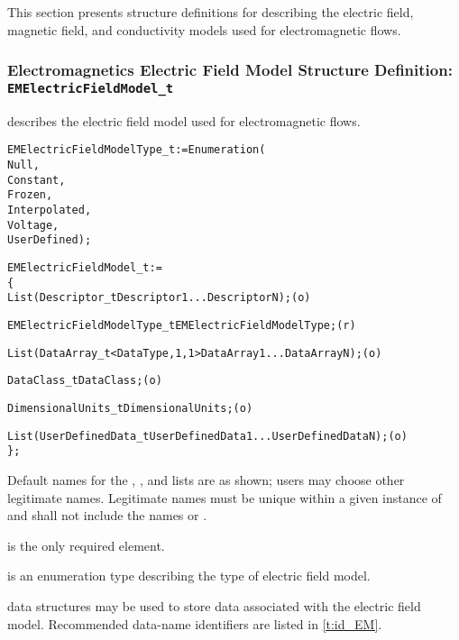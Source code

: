 This section presents structure definitions for describing the electric
field, magnetic field, and conductivity models used for electromagnetic
flows.

\subsubsection{Electromagnetics Electric Field Model Structure Definition: \texttt{EMElectricFieldModel\_t}}

 describes the electric field model used
for electromagnetic flows.
\begin{alltt}
  EMElectricFieldModelType\_t := Enumeration(
    Null,
    Constant,
    Frozen,
    Interpolated,
    Voltage,
    UserDefined ) ;
\end{alltt}

\begin{alltt}
  EMElectricFieldModel\_t :=
    \{
    List( Descriptor\_t Descriptor1 ... DescriptorN ) ;                      (o)

    EMElectricFieldModelType\_t EMElectricFieldModelType ;                   (r)
    
    List( DataArray\_t<DataType, 1, 1> DataArray1 ... DataArrayN ) ;         (o)

    DataClass\_t DataClass ;                                                 (o)
                
    DimensionalUnits\_t DimensionalUnits ;                                   (o)

    List( UserDefinedData\_t UserDefinedData1 ... UserDefinedDataN ) ;       (o)
    \} ;
\end{alltt}

\begin{notes}
\item Default names for the , , and
      lists are as shown; users may choose other legitimate names.
      Legitimate names must be unique within a given instance of
       and shall not include the names
       or .
\item {} is the only required element.
\end{notes}

 is an enumeration type describing
the type of electric field model.

 data structures may be used to store data associated
with the electric field model.
Recommended data-name identifiers are listed in \autoref{t:id_EM}.

